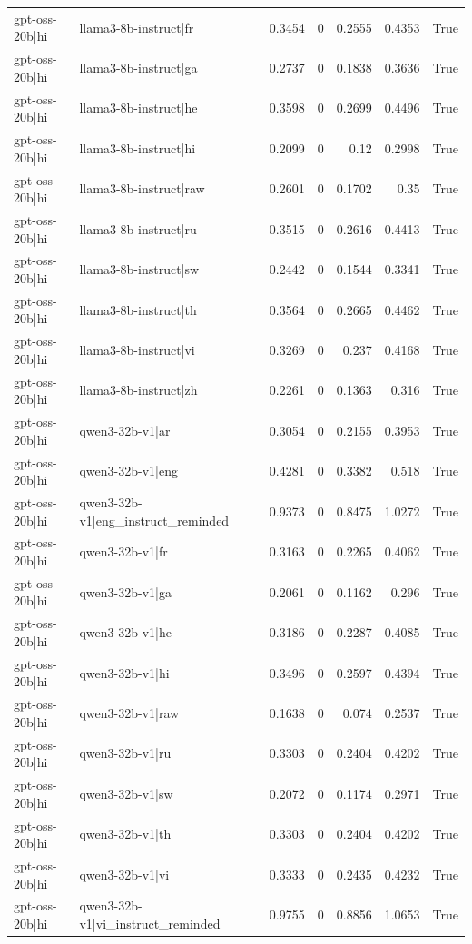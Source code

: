 \begin{table}
\begin{tabular}{l l r r r r l}
gpt-oss-20b|hi & llama3-8b-instruct|fr & 0.3454 & 0 & 0.2555 & 0.4353 & True \\
gpt-oss-20b|hi & llama3-8b-instruct|ga & 0.2737 & 0 & 0.1838 & 0.3636 & True \\
gpt-oss-20b|hi & llama3-8b-instruct|he & 0.3598 & 0 & 0.2699 & 0.4496 & True \\
gpt-oss-20b|hi & llama3-8b-instruct|hi & 0.2099 & 0 & 0.12 & 0.2998 & True \\
gpt-oss-20b|hi & llama3-8b-instruct|raw & 0.2601 & 0 & 0.1702 & 0.35 & True \\
gpt-oss-20b|hi & llama3-8b-instruct|ru & 0.3515 & 0 & 0.2616 & 0.4413 & True \\
gpt-oss-20b|hi & llama3-8b-instruct|sw & 0.2442 & 0 & 0.1544 & 0.3341 & True \\
gpt-oss-20b|hi & llama3-8b-instruct|th & 0.3564 & 0 & 0.2665 & 0.4462 & True \\
gpt-oss-20b|hi & llama3-8b-instruct|vi & 0.3269 & 0 & 0.237 & 0.4168 & True \\
gpt-oss-20b|hi & llama3-8b-instruct|zh & 0.2261 & 0 & 0.1363 & 0.316 & True \\
gpt-oss-20b|hi & qwen3-32b-v1|ar & 0.3054 & 0 & 0.2155 & 0.3953 & True \\
gpt-oss-20b|hi & qwen3-32b-v1|eng & 0.4281 & 0 & 0.3382 & 0.518 & True \\
gpt-oss-20b|hi & qwen3-32b-v1|eng_instruct_reminded & 0.9373 & 0 & 0.8475 & 1.0272 & True \\
gpt-oss-20b|hi & qwen3-32b-v1|fr & 0.3163 & 0 & 0.2265 & 0.4062 & True \\
gpt-oss-20b|hi & qwen3-32b-v1|ga & 0.2061 & 0 & 0.1162 & 0.296 & True \\
gpt-oss-20b|hi & qwen3-32b-v1|he & 0.3186 & 0 & 0.2287 & 0.4085 & True \\
gpt-oss-20b|hi & qwen3-32b-v1|hi & 0.3496 & 0 & 0.2597 & 0.4394 & True \\
gpt-oss-20b|hi & qwen3-32b-v1|raw & 0.1638 & 0 & 0.074 & 0.2537 & True \\
gpt-oss-20b|hi & qwen3-32b-v1|ru & 0.3303 & 0 & 0.2404 & 0.4202 & True \\
gpt-oss-20b|hi & qwen3-32b-v1|sw & 0.2072 & 0 & 0.1174 & 0.2971 & True \\
gpt-oss-20b|hi & qwen3-32b-v1|th & 0.3303 & 0 & 0.2404 & 0.4202 & True \\
gpt-oss-20b|hi & qwen3-32b-v1|vi & 0.3333 & 0 & 0.2435 & 0.4232 & True \\
gpt-oss-20b|hi & qwen3-32b-v1|vi_instruct_reminded & 0.9755 & 0 & 0.8856 & 1.0653 & True \\

\end{tabular}
\end{table}
